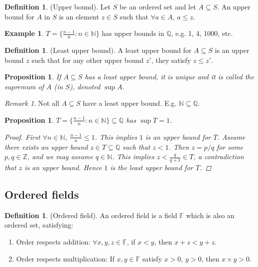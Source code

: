 \documentclass[10pt]{article}
\newcommand{\N}{\mathbb{N}}
\newcommand{\Z}{\mathbb{Z}}
\newcommand{\F}{\mathbb{F}}
\newcommand{\Q}{\mathbb{Q}}
\newtheorem{proposition}[theorem]{Proposition}
\theoremstyle{definition}
\newtheorem{definition}[theorem]{Definition}
\newtheorem{example}[theorem]{Example}
\theoremstyle{remark}
\newtheorem*{remark}{Remark}
\begin{document}
\begin{definition}
    (Upper bound).
    Let $S$ be an ordered set and let $A \subseteq S$. An upper bound for $A$ in $S$ is an element $z \in S$ such that $\forall a \in A$, $a \leq z$.
\end{definition}

\begin{example}
    $T = \{\frac{n-1}{n} \colon n \in \N\}$ has upper bounds in $\Q$, e.g. 1, 4, 1000, etc.
\end{example}

\begin{definition}
    (Least upper bound).
    A least upper bound for $A \subseteq S$ is an upper bound $z$
    such that for any other upper bound $z'$, they satisfy $z \leq z'$.
\end{definition}

\begin{proposition}
    If $A\subseteq S$ has a least upper bound, it is unique and it is called the supremum of $A$ (in $S$), denoted $\sup A$.
\end{proposition}

\begin{remark}
    Not all $A \subseteq S$ have a least upper bound. E.g. $\N \subseteq \Q$.
\end{remark}

\begin{proposition}
    $T = \{\frac{n-1}{n} \colon n \in \N\} \subseteq \Q$ has $\sup T = 1$.
    \begin{proof}
        First $\forall n \in \N$, $\frac{n-1}{n} \leq 1$. This implies $1$ is an upper bound for $T$.
        Assume there exists an upper bound $z \in T \subseteq \Q$ such that $z < 1$. Then $z = p / q$ for some $p, q \in \Z$, and we may assume $q \in \N$.
        This implies $z < \frac{q}{q+1} \in T$, a contradiction that $z$ is an upper bound.
        Hence $1$ is the least upper bound for $T$.
    \end{proof}
\end{proposition}

\subsection{Ordered fields}
\begin{definition}
    (Ordered field).
    An ordered field is a field $\F$ which is also an ordered set, satisfying:
    \begin{enumerate}
        \item Order respects addition: $\forall x, y, z \in \F$, if $x < y$, then $x + z < y + z$.
        \item Order respects multiplication: If $x, y \in \F$ satisfy $x> 0$, $y > 0$, then $x \times y > 0$.
    \end{enumerate}
\end{definition}
\end{document}

